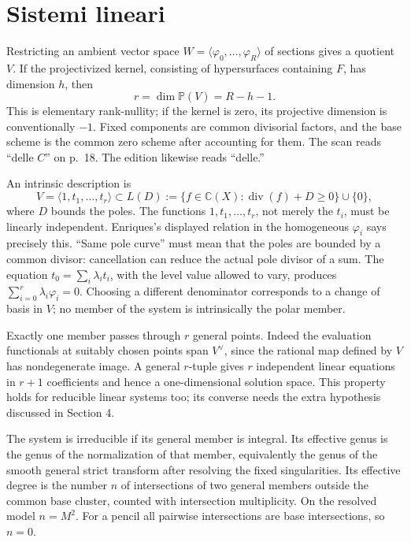 \section{Sistemi lineari}
\label{enriques-I-3}

Restricting an ambient vector space \(W=\langle\varphi_0,\ldots,\varphi_R\rangle\) of sections gives a quotient \(V\). If the projectivized kernel, consisting of hypersurfaces containing \(F\), has dimension \(h\), then \[
r=\dim\mathbb P(V)=R-h-1.
\] This is elementary rank-nullity; if the kernel is zero, its projective dimension is conventionally \(-1\). Fixed components are common divisorial factors, and the base scheme is the common zero scheme after accounting for them. The scan reads ``delle \(C\)'' on p.~18. The edition likewise reads ``delle.''

An intrinsic description is \[
V=\langle1,t_1,\ldots,t_r\rangle\subset
L(D):=\{f\in\mathbb C(X):\operatorname{div}(f)+D\ge0\}\cup\{0\},
\] where \(D\) bounds the poles. The functions \(1,t_1,\ldots,t_r\), not merely the \(t_i\), must be linearly independent. Enriques's displayed relation in the homogeneous \(\varphi_i\) says precisely this. ``Same pole curve'' must mean that the poles are bounded by a common divisor: cancellation can reduce the actual pole divisor of a sum. The equation \(t_0=\sum_i\lambda_it_i\), with the level value allowed to vary, produces \(\sum_{i=0}^r\lambda_i\varphi_i=0\). Choosing a different denominator corresponds to a change of basis in \(V\); no member of the system is intrinsically the polar member.

Exactly one member passes through \(r\) general points. Indeed the evaluation functionals at suitably chosen points span \(V^\vee\), since the rational map defined by \(V\) has nondegenerate image. A general \(r\)-tuple gives \(r\) independent linear equations in \(r+1\) coefficients and hence a one-dimensional solution space. This property holds for reducible linear systems too; its converse needs the extra hypothesis discussed in Section 4.

The system is irreducible if its general member is integral. Its effective genus is the genus of the normalization of that member, equivalently the genus of the smooth general strict transform after resolving the fixed singularities. Its effective degree is the number \(n\) of intersections of two general members outside the common base cluster, counted with intersection multiplicity. On the resolved model \(n=M^2\). For a pencil all pairwise intersections are base intersections, so \(n=0\).

